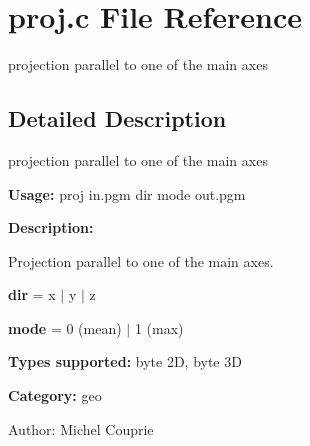 \section{proj.c File Reference}
\label{proj_8c}
projection parallel to one of the main axes 



\subsection{Detailed Description}
projection parallel to one of the main axes 

{\bf Usage:} proj in.pgm dir mode out.pgm

{\bf Description:}

Projection parallel to one of the main axes.

{\bf dir} = x $|$ y $|$ z

{\bf mode} = 0 (mean) $|$ 1 (max)

{\bf Types supported:} byte 2D, byte 3D

{\bf Category:} geo

\begin{Desc}
\item[Author:]Michel Couprie \end{Desc}
